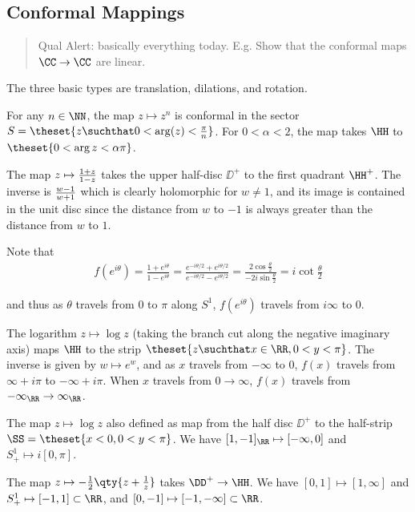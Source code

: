 \hypertarget{conformal-mappings}{%
\subsection{Conformal Mappings}\label{conformal-mappings}}

\begin{quote}
Qual Alert: basically everything today. E.g. Show that the conformal
maps \(\CC\to \CC\) are linear.
\end{quote}

The three basic types are translation, dilations, and rotation.

For any \(n\in \NN\), the map \(z\mapsto z^n\) is conformal in the
sector \(S = \theset{z \suchthat 0 < \arg(z) < {\pi \over n}}\). For
\(0 < \alpha < 2\), the map takes \(\HH\) to
\(\theset{0 < \arg{z} < \alpha\pi}\).

The map \(z \mapsto {1 +z \over 1 - z}\) takes the upper half-disc
\(\DD^+\) to the first quadrant \(\HH^+\). The inverse is
\(w- 1 \over w +1\) which is clearly holomorphic for \(w\neq 1\), and
its image is contained in the unit disc since the distance from \(w\) to
\(-1\) is always greater than the distance from \(w\) to \(1\).

Note that \begin{align*}
f\left(e^{i \theta}\right)=\frac{1+e^{i \theta}}{1-e^{i \theta}}=\frac{e^{-i \theta / 2}+e^{i \theta / 2}}{e^{-i \theta / 2}-e^{i \theta / 2}}=\frac{2 \cos \frac{\theta}{2}}{-2 i \sin \frac{\theta}{2}}=i \cot \frac{\theta}{2}
\end{align*}

and thus as \(\theta\) travels from \(0\) to \(\pi\) along \(S^1\),
\(f(e^{i\theta})\) travels from \(i\infty\) to 0.

The logarithm \(z\mapsto \log z\) (taking the branch cut along the
negative imaginary axis) maps \(\HH\) to the strip
\(\theset{z \suchthat x\in \RR, 0 < y < \pi}\). The inverse is given by
\(w \mapsto e^w\), and as \(x\) travels from \(-\infty\) to \(0\),
\(f(x)\) travels from \(\infty + i\pi\) to \(-\infty + i\pi\). When
\(x\) travels from \(0\to\infty\), \(f(x)\) travels from
\(-\infty_\RR \to \infty_\RR\).

The map \(z \mapsto \log z\) also defined as map from the half disc
\(\DD^+\) to the half-strip \(\SS = \theset{x <0, 0 < y < \pi}\). We
have \([1, -1]_\RR \mapsto [-\infty ,0]\) and
\(S^1_+ \mapsto i[0, \pi]\).

The map \(z \mapsto -{1 \over 2}\qty{z + {1 \over z}}\) takes
\(\DD^+ \to \HH\). We have \([0, 1] \mapsto [1 ,\infty]\) and
\(S^1_+ \mapsto [-1, 1]\subset \RR\), and
\([0, -1] \mapsto [-1, -\infty] \subset \RR\).

